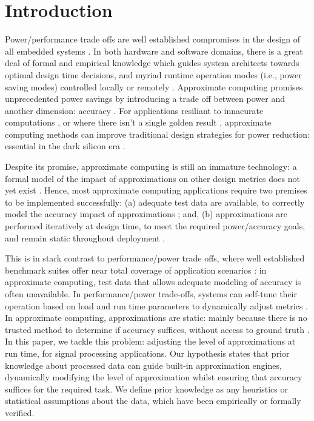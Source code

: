\section{Introduction}

Power/performance trade offs are well established compromises in the design of all embedded systems \cite{das2016reliability}. In both hardware and software domains, there is a great deal of formal and empirical knowledge which guides system architects towards optimal design time decisions, and myriad runtime operation modes (i.e., power saving modes) controlled locally or remotely \cite{senni2016non}. Approximate computing promises unprecedented power savings by introducing a trade off between power and another dimension: accuracy \cite{mittal2016survey}. For applications resiliant to innacurate computations \cite{xu2016approximate}, or where there isn't a single golden result \cite{venkataramani2016approximate}, approximate computing methods can improve traditional design strategies for power reduction: essential in the dark silicon era \cite{mitra2017power}.
\par Despite its promise, approximate computing is still an immature technology: a formal model of the impact of approximations on other design metrics does not yet exist \cite{venkataramani2015approximate}. Hence, most approximate computing applications require two premises to be implemented successfully: (a) adequate test data are available, to correctly model the accuracy impact of approximations \cite{yazdanbakhsh2017axbench}; and, (b) approximations are performed iteratively at design time, to meet the required power/accuracy goals, and remain static throughout deployment \cite{nepal2016automated}.
\par This is in stark contrast to performance/power trade offs, where well established benchmark suites offer near total coverage of application scenarios \cite{henning2000spec}: in approximate computing, test data that allows adequate modeling of accuracy is often unavailable. In performance/power trade-offs, systems can self-tune their operation based on load and run time parameters to dynamically adjust metrics \cite{isci2003runtime}. In approximate computing, approximations are static: mainly because there is no trusted method to determine if accuracy suffices, without access to ground truth \cite{chippa2013analysis}. In this paper, we tackle this problem:  adjusting the level of approximations at run time, for signal processing applications. Our hypothesis states that prior knowledge about processed data can guide built-in approximation engines, dynamically modifying the level of approximation whilst ensuring that accuracy suffices for the required task. We define prior knowledge as any heuristics or statistical assumptions about the data, which have been empirically or formally verified.


